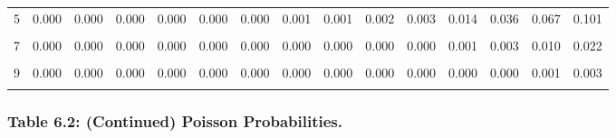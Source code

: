 \documentclass[
]{article}
\begin{document}
\begin{table}[!h]
{\begin{tabular}[t]{ccccccccccccccc}
5 & 0.000 & 0.000 & 0.000 & 0.000 & 0.000 & 0.000 & 0.001 & 0.001 & 0.002 & 0.003 & 0.014 & 0.036 & 0.067 & 0.101\\
\cellcolor{gray!10}{6} & \cellcolor{gray!10}{0.000} & \cellcolor{gray!10}{0.000} & \cellcolor{gray!10}{0.000} & \cellcolor{gray!10}{0.000} & \cellcolor{gray!10}{0.000} & \cellcolor{gray!10}{0.000} & \cellcolor{gray!10}{0.000} & \cellcolor{gray!10}{0.000} & \cellcolor{gray!10}{0.000} & \cellcolor{gray!10}{0.001} & \cellcolor{gray!10}{0.004} & \cellcolor{gray!10}{0.012} & \cellcolor{gray!10}{0.028} & \cellcolor{gray!10}{0.050}\\
7 & 0.000 & 0.000 & 0.000 & 0.000 & 0.000 & 0.000 & 0.000 & 0.000 & 0.000 & 0.000 & 0.001 & 0.003 & 0.010 & 0.022\\
\cellcolor{gray!10}{8} & \cellcolor{gray!10}{0.000} & \cellcolor{gray!10}{0.000} & \cellcolor{gray!10}{0.000} & \cellcolor{gray!10}{0.000} & \cellcolor{gray!10}{0.000} & \cellcolor{gray!10}{0.000} & \cellcolor{gray!10}{0.000} & \cellcolor{gray!10}{0.000} & \cellcolor{gray!10}{0.000} & \cellcolor{gray!10}{0.000} & \cellcolor{gray!10}{0.000} & \cellcolor{gray!10}{0.001} & \cellcolor{gray!10}{0.003} & \cellcolor{gray!10}{0.008}\\
9 & 0.000 & 0.000 & 0.000 & 0.000 & 0.000 & 0.000 & 0.000 & 0.000 & 0.000 & 0.000 & 0.000 & 0.000 & 0.001 & 0.003\\
\addlinespace
\cellcolor{gray!10}{10} & \cellcolor{gray!10}{0.000} & \cellcolor{gray!10}{0.000} & \cellcolor{gray!10}{0.000} & \cellcolor{gray!10}{0.000} & \cellcolor{gray!10}{0.000} & \cellcolor{gray!10}{0.000} & \cellcolor{gray!10}{0.000} & \cellcolor{gray!10}{0.000} & \cellcolor{gray!10}{0.000} & \cellcolor{gray!10}{0.000} & \cellcolor{gray!10}{0.000} & \cellcolor{gray!10}{0.000} & \cellcolor{gray!10}{0.000} & \cellcolor{gray!10}{0.001}\\
\bottomrule
\end{tabular}}
\end{table}

\newpage

\subsubsection{Table 6.2: (Continued) Poisson
Probabilities.}\label{table-6.2-continued-poisson-probabilities.}
\end{document}
